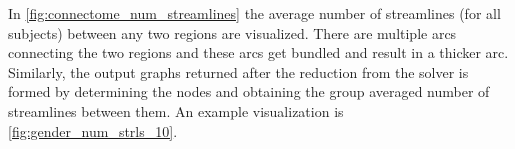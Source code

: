 \documentclass[msthesis.tex]{subfiles}
\begin{document}
In \autoref{fig:connectome_num_streamlines} the average number of streamlines (for all subjects) between any two regions are visualized. There are multiple arcs connecting the two regions and these arcs get bundled and result in a thicker arc. Similarly, the output graphs returned after the reduction from the solver is formed by determining the nodes and obtaining the group averaged number of streamlines between them. An example visualization is \autoref{fig:gender_num_strls_10}.
\end{document}
